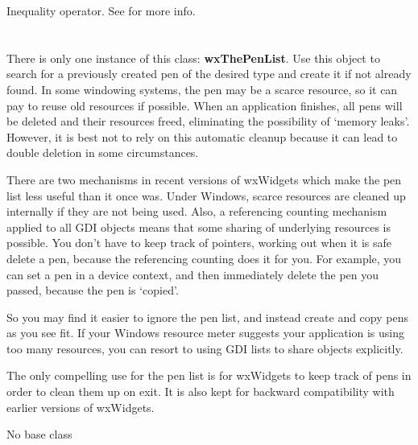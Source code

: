 
Inequality operator.
See  for more info.




\section{}\label{wxpenlist}

There is only one instance of this class: {\bf wxThePenList}.  Use
this object to search for a previously created pen of the desired
type and create it if not already found. In some windowing systems,
the pen may be a scarce resource, so it can pay to reuse old
resources if possible. When an application finishes, all pens will
be deleted and their resources freed, eliminating the possibility of
`memory leaks'. However, it is best not to rely on this automatic
cleanup because it can lead to double deletion in some circumstances.

There are two mechanisms in recent versions of wxWidgets which make the
pen list less useful than it once was. Under Windows, scarce resources
are cleaned up internally if they are not being used. Also, a referencing
counting mechanism applied to all GDI objects means that some sharing
of underlying resources is possible. You don't have to keep track of pointers,
working out when it is safe delete a pen, because the referencing counting does
it for you. For example, you can set a pen in a device context, and then
immediately delete the pen you passed, because the pen is `copied'.

So you may find it easier to ignore the pen list, and instead create
and copy pens as you see fit. If your Windows resource meter suggests
your application is using too many resources, you can resort to using
GDI lists to share objects explicitly.

The only compelling use for the pen list is for wxWidgets to keep
track of pens in order to clean them up on exit. It is also kept for
backward compatibility with earlier versions of wxWidgets.




No base class


